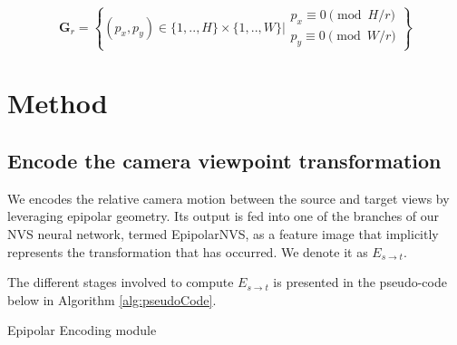 \begin{equation}
    \mathbf{G}_{r} = \left\{(p_{x},p_{y}) \in \{1,..,H\}\times \{1,..,W\} \Big\rvert \begin{array}{l}
                    p_x \equiv 0 \pmod{H/r}\\
             p_y \equiv 0 \pmod{W/r}
              \end{array}\right\}
\end{equation}

\section{Method}

\subsection{Encode the camera viewpoint transformation}

We encodes the relative camera motion between the source and target views by leveraging epipolar geometry. Its output is fed into one of the branches of our \ac{NVS} neural network, termed EpipolarNVS, as a feature image that implicitly represents the transformation that has occurred. We denote it as $E_{s\xrightarrow{}t}$.\newline 

The different stages involved to compute $E_{s\xrightarrow{}t}$ is presented in the pseudo-code below in Algorithm \ref{alg:pseudoCode}. \newline



\begin{algorithm}[htp!]
  \caption{Epipolar Encoding module \label{alg:pseudoCode}}
  
  \medskip
  
\end{algorithm}

